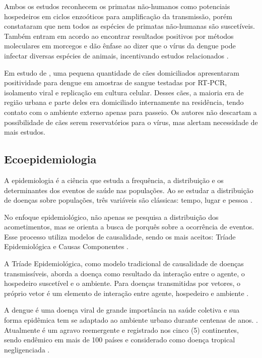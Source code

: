 \indent Ambos os estudos reconhecem os primatas não-humanos como potenciais hospedeiros em ciclos enzoóticos para amplificação da transmissão, porém constataram que nem todos as espécies de primatas não-humanas são suscetíveis. Também entram em acordo ao encontrar resultados positivos por métodos moleculares em morcegos e dão ênfase ao dizer que o vírus da dengue pode infectar diversas espécies de animais, incentivando estudos relacionados \cite{Aldana2024DengueAnimals, DengueAnimalsGwee2021}.

\indent Em estudo de , uma pequena quantidade de cães domiciliados apresentaram positividade para dengue em amostras de sangue testadas por RT-PCR, isolamento viral e replicação em cultura celular. Desses cães, a maioria era de região urbana e parte deles era domiciliado internamente na residência, tendo contato com o ambiente externo apenas para passeio. Os autores não descartam a possibilidade de cães serem reservatórios para o vírus, mas alertam necessidade de mais estudos.

\subsection{Ecoepidemiologia}

\indent A epidemiologia é a ciência que estuda a frequência, a distribuição e os determinantes dos eventos de saúde nas populações. Ao se estudar a distribuição de doenças sobre populações, três variáveis são clássicas: tempo, lugar e pessoa \cite{MOPECE2010}.

\indent No enfoque epidemiológico, não apenas se pesquisa a distribuição dos acometimentos, mas se orienta a busca de porquês sobre a ocorrência de eventos. Esse processo utiliza modelos de causalidade, sendo os mais aceitos: Tríade Epidemiológica e Causas Componentes \cite{MOPECE2010}.

\indent A Tríade Epidemiológica, como modelo tradicional de causalidade de doenças transmissíveis, aborda a doença como resultado da interação entre o agente, o hospedeiro suscetível e o ambiente. Para doenças transmitidas por vetores, o próprio vetor é um elemento de interação entre agente, hospedeiro e ambiente \cite{MOPECE2010}. 

\indent A dengue é uma doença viral de grande importância na saúde coletiva e sua forma epidêmica tem se adaptado ao ambiente urbano durante centenas de anos. \cite{ArboviralTransmission}. Atualmente é um agravo reemergente e registrado nos cinco (5) continentes, sendo endêmico em mais de 100 países e considerado como doença tropical negligenciada \cite{Valle2015Dengue}.

